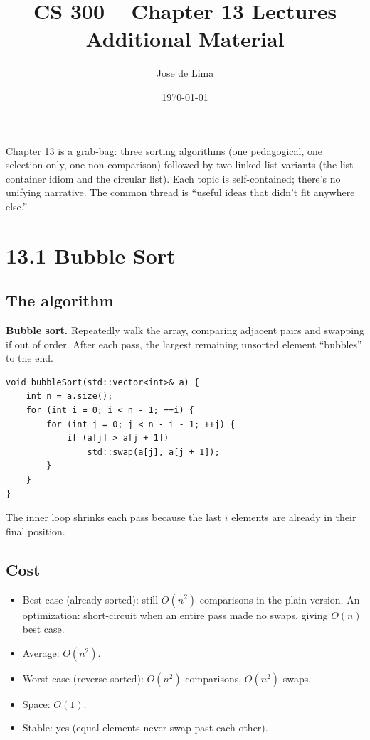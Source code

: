 \documentclass[11pt]{article}
\title{CS 300 -- Chapter 13 Lectures\\\large Additional Material}
\author{Jose de Lima}
\date{\today}
\begin{document}
\maketitle

\begin{ideabox}
Chapter 13 is a grab-bag: three sorting algorithms (one pedagogical, one selection-only, one non-comparison) followed by two linked-list variants (the list-container idiom and the circular list). Each topic is self-contained; there's no unifying narrative. The common thread is ``useful ideas that didn't fit anywhere else.''
\end{ideabox}

\section{13.1 Bubble Sort}

\subsection*{The algorithm}

\begin{defnbox}
\textbf{Bubble sort.} Repeatedly walk the array, comparing adjacent pairs and swapping if out of order. After each pass, the largest remaining unsorted element ``bubbles'' to the end.
\end{defnbox}

\begin{lstlisting}[basicstyle=\ttfamily\small,frame=single]
void bubbleSort(std::vector<int>& a) {
    int n = a.size();
    for (int i = 0; i < n - 1; ++i) {
        for (int j = 0; j < n - i - 1; ++j) {
            if (a[j] > a[j + 1])
                std::swap(a[j], a[j + 1]);
        }
    }
}
\end{lstlisting}

The inner loop shrinks each pass because the last $i$ elements are already in their final position.

\subsection*{Cost}

\begin{itemize}[leftmargin=*]
    \item Best case (already sorted): still $O(n^2)$ comparisons in the plain version. An optimization: short-circuit when an entire pass made no swaps, giving $O(n)$ best case.
    \item Average: $O(n^2)$.
    \item Worst case (reverse sorted): $O(n^2)$ comparisons, $O(n^2)$ swaps.
    \item Space: $O(1)$.
    \item Stable: yes (equal elements never swap past each other).
\end{itemize}
\end{document}
